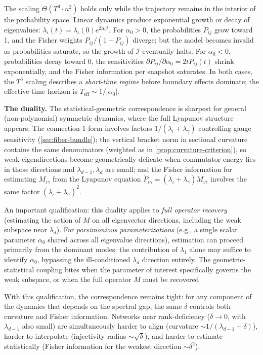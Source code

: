 \documentclass{article}
\theoremstyle{plain}
\theoremstyle{definition}
\theoremstyle{remark}
\begin{document}
The scaling $\Theta(T^3 \cdot n^2)$ holds only while the trajectory remains in the interior of the probability space.
Linear dynamics produce exponential growth or decay of eigenvalues: $\lambda_\iota(t) = \lambda_\iota(0) e^{2 \alpha_0 t}$.
For $\alpha_0 > 0$, the probabilities $P_{ij}$ grow toward 1, and the Fisher weights $P_{ij}/(1 - P_{ij})$ diverge; but the model becomes invalid as probabilities saturate, so the growth of $\mathcal{I}$ eventually halts.
For $\alpha_0 < 0$, probabilities decay toward 0, the sensitivities $\partial P_{ij} / \partial \alpha_0 = 2 t P_{ij}(t)$ shrink exponentially, and the Fisher information per snapshot saturates.
In both cases, the $T^3$ scaling describes a \emph{short-time regime} before boundary effects dominate; the effective time horizon is $T_{\mathrm{eff}} \sim 1/|\alpha_0|$.

\textbf{The duality.}
The statistical-geometric correspondence is sharpest for general (non-polynomial) symmetric dynamics, where the full Lyapunov structure appears.
The connection 1-form involves factors $1 / (\lambda_\iota + \lambda_\gamma)$ controlling gauge sensitivity (\cref{sec:fiber-bundle}); the vertical bracket norm in sectional curvature contains the same denominators (weighted as in \cref{prop:curvature-criterion}), so weak eigendirections become geometrically delicate when commutator energy lies in those directions and $\lambda_{d-1}, \lambda_d$ are small; and the Fisher information for estimating $M_{\iota\gamma}$ from the Lyapunov equation $\dot{P}_{\iota\gamma} = (\lambda_\iota + \lambda_\gamma) M_{\iota\gamma}$ involves the same factor $(\lambda_\iota + \lambda_\gamma)^2$.

An important qualification: this duality applies to \emph{full operator recovery} (estimating the action of $M$ on all eigenvector directions, including the weak subspace near $\lambda_d$).
For \emph{parsimonious parameterizations} (e.g., a single scalar parameter $\alpha_0$ shared across all eigenvalue directions), estimation can proceed primarily from the dominant modes: the contribution of $\lambda_1$ alone may suffice to identify $\alpha_0$, bypassing the ill-conditioned $\lambda_d$ direction entirely.
The geometric-statistical coupling bites when the parameter of interest specifically governs the weak subspace, or when the full operator $M$ must be recovered.

With this qualification, the correspondence remains tight: for any component of the dynamics that depends on the spectral gap, the same $\delta$ controls both curvature and Fisher information.
Networks near rank-deficiency ($\delta \to 0$, with $\lambda_{d-1}$ also small) are simultaneously harder to align (curvature $\sim 1/(\lambda_{d-1} + \delta)$), harder to interpolate (injectivity radius $\sim \sqrt{\delta}$), and harder to estimate statistically (Fisher information for the weakest direction $\sim \delta^2$).
\end{document}
